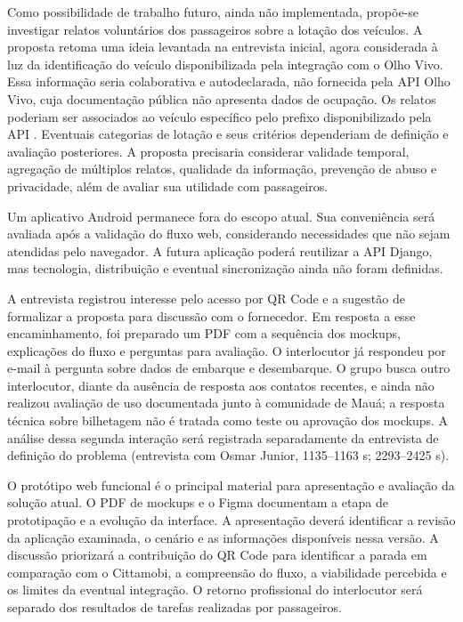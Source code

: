 \documentclass[12pt,oneside,a4paper,brazil,chapter=TITLE]{abntex2}
\begin{document}
Como possibilidade de trabalho futuro, ainda não implementada, propõe-se investigar relatos voluntários dos passageiros sobre a lotação dos veículos. A proposta retoma uma ideia levantada na entrevista inicial, agora considerada à luz da identificação do veículo disponibilizada pela integração com o Olho Vivo. Essa informação seria colaborativa e autodeclarada, não fornecida pela API Olho Vivo, cuja documentação pública não apresenta dados de ocupação. Os relatos poderiam ser associados ao veículo específico pelo prefixo disponibilizado pela API \citep{sptransapi}. Eventuais categorias de lotação e seus critérios dependeriam de definição e avaliação posteriores. A proposta precisaria considerar validade temporal, agregação de múltiplos relatos, qualidade da informação, prevenção de abuso e privacidade, além de avaliar sua utilidade com passageiros.

Um aplicativo Android permanece fora do escopo atual. Sua conveniência será avaliada após a validação do fluxo web, considerando necessidades que não sejam atendidas pelo navegador. A futura aplicação poderá reutilizar a API Django, mas tecnologia, distribuição e eventual sincronização ainda não foram definidas.

A entrevista registrou interesse pelo acesso por QR Code e a sugestão de formalizar a proposta para discussão com o fornecedor. Em resposta a esse encaminhamento, foi preparado um PDF com a sequência dos mockups, explicações do fluxo e perguntas para avaliação. O interlocutor já respondeu por e-mail à pergunta sobre dados de embarque e desembarque. O grupo busca outro interlocutor, diante da ausência de resposta aos contatos recentes, e ainda não realizou avaliação de uso documentada junto à comunidade de Mauá; a resposta técnica sobre bilhetagem não é tratada como teste ou aprovação dos mockups. A análise dessa segunda interação será registrada separadamente da entrevista de definição do problema  (entrevista com Osmar Junior, 1135--1163 s; 2293--2425 s).

O protótipo web funcional é o principal material para apresentação e avaliação da solução atual. O PDF de mockups e o Figma documentam a etapa de prototipação e a evolução da interface. A apresentação deverá identificar a revisão da aplicação examinada, o cenário e as informações disponíveis nessa versão. A discussão priorizará a contribuição do QR Code para identificar a parada em comparação com o Cittamobi, a compreensão do fluxo, a viabilidade percebida e os limites da eventual integração. O retorno profissional do interlocutor será separado dos resultados de tarefas realizadas por passageiros.
\end{document}

